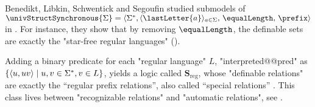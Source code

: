 Benedikt, Libkin, Schwentick and Segoufin studied submodels of
$\univStructSynchronous{\Sigma} =
\tup{\Sigma^*, \langle\lastLetter{a}\rangle_{a \in \Sigma},\, \equalLength,\, \prefix}$ in
\cite{BenediktLibkinSchwentickSegoufin2003DefinableRelations}.
For instance, they show that by removing $\equalLength$, the definable sets are exactly
the "star-free regular languages"
(\cite[Corollary 3.7]{BenediktLibkinSchwentickSegoufin2003DefinableRelations}).

Adding a binary predicate for each "regular language" $L$, "interpreted@@pred"
as $\{\langle u,uv\rangle \mid u,v \in \Sigma^*, v \in L \}$, yields
a logic called $\symbf{S}_{\mathrm{reg}}$, whose "definable relations"
are exactly the ``regular prefix relations'', also called ``special relations''
\cite[Corollary 3.22]{BenediktLibkinSchwentickSegoufin2003DefinableRelations}.
This class lives between "recognizable relations" and "automatic relations",
see \cite[\S~``1984'']{Choffrut2006Survey}.